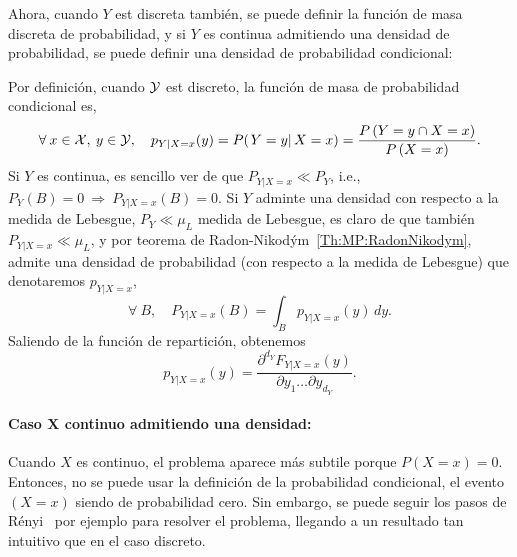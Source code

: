 Ahora, cuando $Y$ est discreta tambi\'en,  se puede definir la funci\'on de masa
discreta  de probabilidad,  y  si $Y$  es  continua admitiendo  una densidad  de
probabilidad, se puede definir una densidad de probabilidad condicional:
%
\begin{definicion}
  Por  definici\'on,  cuando  $\mathcal{Y}$  est   discreto,  la  funci\'on  de  masa  de
  probabilidad condicional es,
  \[
  \forall \:  x \in  \mathcal{X}, \: y  \in \mathcal{Y}, \quad  p_{Y|X=x}(y) =  P( \left. Y  = y
  \right|  X =  x  ) =  \frac{P\left(Y  = y  \cap X  =  x \right)}{P\left(X  =
      x\right)}.
  \]
  Si $Y$ es continua, es sencillo  ver de que $P_{Y|X=x} \ll P_Y$, i.e., $P_Y(B)
  = 0  \: \Rightarrow  \: P_{Y|X=x}(B) =  0$.  Si  $Y$ adminte una  densidad con
  respecto a la medida de Lebesgue,  $P_Y \ll \mu_L$ medida de Lebesgue, es claro
  de    que   tambi\'en   $P_{Y|X=x}    \ll   \mu_L$,    y   por    teorema   de
  Radon-Nikod\'ym~\ref{Th:MP:RadonNikodym}, admite  una densidad de probabilidad
  (con respecto a la medida de Lebesgue) que denotaremos $p_{Y|X=x}$,
  \[
  \forall \: B, \quad P_{Y|X=x}(B) = \int_B p_{Y|X=x}(y) \, dy.
  \]
  Saliendo de la funci\'on de repartici\'on, obtenemos
  \[
  p_{Y|X=x}(y) = \frac{\partial^{d_Y} F_{Y|X=x}(y)}{\partial y_1 \ldots \partial
    y_{d_Y}}.
  \]
\end{definicion}



\paragraph{Caso $\boldsymbol{X}$ continuo admitiendo una densidad:}
Cuando  $X$ es  continuo, el  problema aparece  m\'as subtile  porque  $P(X=x) =
0$. Entonces, no  se puede usar la definici\'on  de la probabilidad condicional,
el evento $(X=x)$ siendo de probabilidad cero.  Sin embargo, se puede seguir los
pasos  de  R\'enyi~\cite[Cap.~5]{Ren} por  ejemplo  para  resolver el  problema,
llegando a un resultado tan intuitivo que en el caso discreto.

